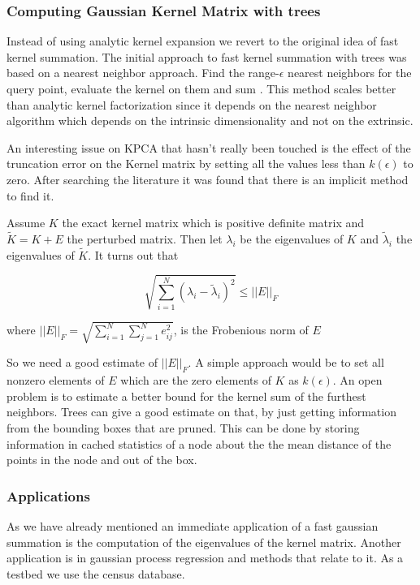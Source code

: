 \documentclass[12pt,letterpaper,doublespaced,ETD,dvips,proposal]{gtthesis}
\begin{document}
\begin{Body}
\subsubsection{Computing Gaussian Kernel Matrix with trees}
Instead of using analytic kernel expansion we revert to the original
idea of fast kernel summation. The initial approach to fast kernel
summation with trees was based on a nearest neighbor approach. Find
the range-$\epsilon$ nearest neighbors for the query point, evaluate
the kernel on them and sum \cite{gray2003rem}. This method scales better than analytic
kernel factorization since it depends on the nearest neighbor
algorithm which depends on the intrinsic dimensionality and not on
the extrinsic.

An interesting issue on KPCA that hasn't really been touched is the
effect of the truncation error on the Kernel matrix by setting all
the values less than $k(\epsilon)$ to zero. After searching the
literature it was found that there is an implicit method to find it.

Assume $K$ the exact kernel matrix which is positive definite matrix
and $\tilde{K}=K+E$ the perturbed matrix. Then let $\lambda_i$ be
the eigenvalues of $K$ and $\tilde{\lambda}_i$ the eigenvalues of
$\tilde{K}$. It turns out \cite{stewart1990mpt} that

\begin{equation}
\sqrt{\sum_{i=1}^{N}(\lambda_i-\tilde{\lambda}_i)^2}\leq ||E||_F
\end{equation}

where $||E||_F=\sqrt{\sum_{i=1}^{N}\sum_{j=1}^{N}e_{ij}^2}$, is the
Frobenious norm of $E$

So we need a good estimate of $||E||_F$. A simple approach would be
to set all nonzero elements of $E$ which are the zero elements of
$K$ as $k(\epsilon)$.  An open problem is to estimate a better bound
for the kernel sum of the furthest neighbors. Trees can give  a good
estimate on that, by just getting information from the bounding
boxes that are pruned. This can be done by storing information in cached statistics of 
a node about the the mean distance of the points in the node and out of the box.

\subsubsection{Applications}
As we have already mentioned an immediate application of a fast gaussian summation is the 
computation of the eigenvalues of the kernel matrix. Another application is in gaussian process
regression and methods that relate to it. As a testbed we use the census database.


\end{Body}
\end{document}
